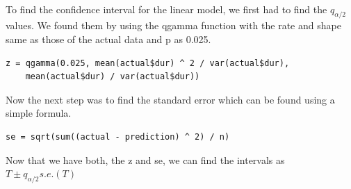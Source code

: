 \documentclass[11pt]{article}
\begin{document}
\\
\par
To find the confidence interval for the linear model, we first had to find the $q_{\alpha/2}$ values. We found them by using the qgamma function with the rate and shape same as those of the actual data and p as 0.025.
\begin{lstlisting}
z = qgamma(0.025, mean(actual$dur) ^ 2 / var(actual$dur), 
    mean(actual$dur) / var(actual$dur))
\end{lstlisting}
\par
Now the next step was to find the standard error which can be found using a simple formula.
\begin{lstlisting}
se = sqrt(sum((actual - prediction) ^ 2) / n)
\end{lstlisting}
Now that we have both, the z and se, we can find the intervals as $T \pm q_{\alpha/2} s.e.(T)$
\end{document}
